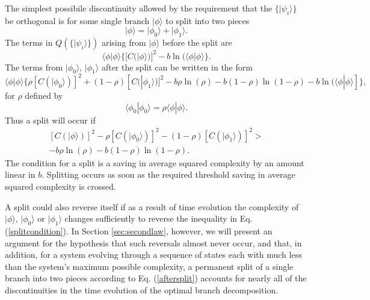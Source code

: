 \documentclass[12pt,amsmath,amssymb,onecolumn]{revtex4-2}
\begin{document}
The simplest possibile discontinuity allowed by the requirement that the
$\{ |\psi_i \rangle  \}$ be orthogonal is for some single branch $|\phi \rangle $ to split
into two pieces
\begin{equation}\label{splitphi}
|\phi \rangle  = |\phi_0 \rangle  + |\phi_1 \rangle .
\end{equation}
The terms in $Q( \{|\psi_i \rangle \})$ arising from $|\phi \rangle $ before
the split are
\begin{equation}\label{beforesplit}
 \langle \phi|\phi \rangle \{[C( |\phi \rangle )]^2 - b \ln(  \langle  \phi | \phi \rangle \}.
\end{equation}
The terms from $|\phi_0 \rangle $, $|\phi_1 \rangle $ after the split can be written in the form
\begin{equation}\label{aftersplit}
 \langle \phi|\phi \rangle \{ \rho [C( |\phi_0 \rangle )]^2 + ( 1 - \rho) [C( |\phi_1 \rangle )]^2 - 
b \rho \ln( \rho) - b ( 1 - \rho) \ln( 1 - \rho)  - b \ln(  \langle  \phi| \phi \rangle ]\},
\end{equation}
for $\rho$ defined by
\begin{equation}
    \label{defofrho}
     \langle  \phi_0 | \phi_0 \rangle  = \rho  \langle  \phi | \phi \rangle .
\end{equation}
Thus a split will occur if
\begin{multline}\label{splitcondition}
[C( |\phi \rangle )]^2 - \rho [C( |\phi_0 \rangle )]^2 - ( 1 - \rho) [C( |\phi_1 \rangle )]^2 > \\
-b \rho \ln( \rho) - b ( 1 - \rho) \ln( 1 - \rho).
\end{multline}
The condition for a split is a saving in average squared complexity
by an amount linear in $b$. 
Splitting occurs as soon as the required threshold 
saving in average squared complexity is crossed.

A split could also reverse itself if as a result of time evolution
the complexity of $|\phi \rangle $, $|\phi_0 \rangle $ or $|\phi_1 \rangle $ changes sufficiently to
reverse the inequality in Eq. (\ref{splitcondition}). 
In Section \ref{sec:secondlaw}, however, we will
present an argument for the hypothesis
that such reversals almost never occur, and that,
in addition, for a system evolving through
a sequence of states each with much less than the
system's maximum possible complexity,
a permanent split
of a single branch into two pieces according to
Eq. (\ref{aftersplit})
accounts for nearly all of the discontinuities
in the time evolution of 
the optimal branch decomposition.
\end{document}
